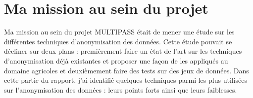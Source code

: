  \section{Ma mission au sein du projet} 

Ma mission au sein du projet MULTIPASS était de mener une étude sur les différentes techniques d’anonymisation des données. Cette étude pouvait se décliner sur deux plans : premièrement faire un état de l’art sur les techniques d’anonymisation déjà existantes et proposer une façon de les appliqués au domaine agricoles et deuxièmement faire des tests sur des jeux de données. Dans cette  partie du rapport, j'ai identifié quelques techniques parmi les plus utilisées sur l’anonymisation des données : leurs points forts ainsi que leurs faiblesses. 